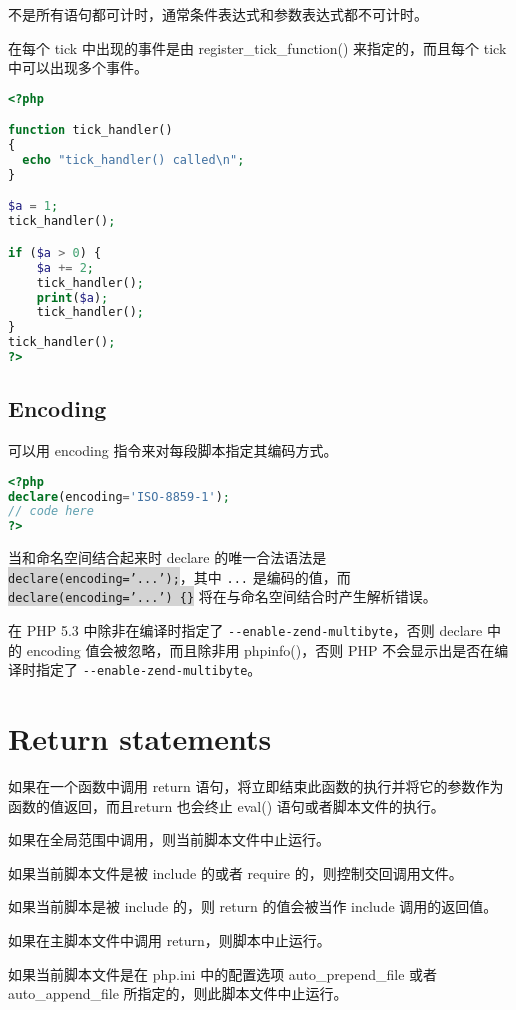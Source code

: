 不是所有语句都可计时，通常条件表达式和参数表达式都不可计时。

在每个 tick 中出现的事件是由 register\_tick\_function() 来指定的，而且每个 tick 中可以出现多个事件。

\begin{lstlisting}[language=PHP]
<?php

function tick_handler()
{
  echo "tick_handler() called\n";
}

$a = 1;
tick_handler();

if ($a > 0) {
    $a += 2;
    tick_handler();
    print($a);
    tick_handler();
}
tick_handler();
?>
\end{lstlisting}

\subsection{Encoding}

可以用 encoding 指令来对每段脚本指定其编码方式。


\begin{lstlisting}[language=PHP]
<?php
declare(encoding='ISO-8859-1');
// code here
?>
\end{lstlisting}



当和命名空间结合起来时 declare 的唯一合法语法是 \colorbox{lightgray}{\texttt{declare(encoding='...');}}，其中 \texttt{...} 是编码的值，而 \colorbox{lightgray}{\texttt{declare(encoding='...') \{\}}} 将在与命名空间结合时产生解析错误。

在 PHP 5.3 中除非在编译时指定了 \texttt{-\/-enable-zend-multibyte}，否则 declare 中的 encoding 值会被忽略，而且除非用 phpinfo()，否则 PHP 不会显示出是否在编译时指定了 \texttt{-\/-enable-zend-multibyte}。

\section{Return statements}

如果在一个函数中调用 return 语句，将立即结束此函数的执行并将它的参数作为函数的值返回，而且return 也会终止 eval() 语句或者脚本文件的执行。


\begin{compactitem}
\item 如果在全局范围中调用，则当前脚本文件中止运行。
\item 如果当前脚本文件是被 include 的或者 require 的，则控制交回调用文件。
\item 如果当前脚本是被 include 的，则 return 的值会被当作 include 调用的返回值。
\item 如果在主脚本文件中调用 return，则脚本中止运行。
\item 如果当前脚本文件是在 php.ini 中的配置选项 auto\_prepend\_file 或者 auto\_append\_file 所指定的，则此脚本文件中止运行。
\end{compactitem}


